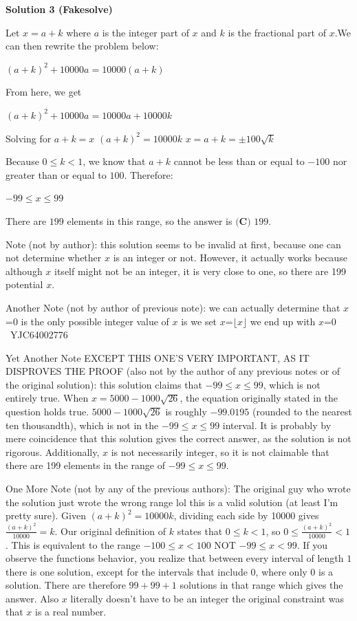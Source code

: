\begin{enumerate}
 



\textbf{Solution 3 (Fakesolve)}

Let $x = a+k$ where $a$ is the integer part of $x$ and $k$ is the fractional part of $x$.We can then rewrite the problem below:

 $(a+k)^2 + 10000a = 10000(a+k)$

 From here, we get

 $(a+k)^2 + 10000a = 10000a + 10000k$

 Solving for $a+k = x$
$(a+k)^2 = 10000k$
$x = a+k = \pm100\sqrt{k}$

 Because $0 \leq k < 1$, we know that $a+k$ cannot be less than or equal to $-100$ nor greater than or equal to $100$. Therefore:

 $-99 \leq x \leq 99$

 There are $199$ elements in this range, so the answer is $\boxed{\textbf{(C)} \text{ 199}}$.

 
Note (not by author): this solution seems to be invalid at first, because one can not determine whether $x$ is an integer or not. However, it actually works because although $x$ itself might not be an integer, it is very close to one, so there are 199 potential $x$.

 
Another Note (not by author of previous note): we can actually determine that $x$=0 is the only possible integer value of $x$ is we set $x$=$\lfloor x \rfloor$ we end up with $x$=0   ~YJC64002776

 
Yet Another Note EXCEPT THIS ONE'S VERY IMPORTANT, AS IT DISPROVES THE PROOF (also not by the author of any previous notes or of the original solution): this solution claims that $-99 \leq x \leq 99$, which is not entirely true. When $x = 5000-1000\sqrt{26}$, the equation originally stated in the question holds true. $5000-1000\sqrt{26}$ is roughly $-99.0195$ (rounded to the nearest ten thousandth), which is not in the $-99 \leq x \leq 99$ interval. It is probably by mere coincidence that this solution gives the correct answer, as the solution is not rigorous. Additionally, $x$ is not necessarily integer, so it is not claimable that there are 199 elements in the range of $-99 \leq x \leq 99$.

 
One More Note (not by any of the previous authors): The original guy who wrote the solution just wrote the wrong range lol this is a valid solution (at least I'm pretty sure). Given $(a+k)^2 = 10000k$, dividing each side by 10000 gives $\frac{(a+k)^2}{10000} = k$. Our original definition of $k$ states that $0 \leq k < 1$, so $0 \leq \frac{(a+k)^2}{10000} < 1$. This is equivalent to the range $-100 \leq x < 100$ NOT $-99 \leq x < 99$. If you observe the functions behavior, you realize that between every interval of length $1$ there is one solution, except for the intervals that include $0$, where only $0$ is a solution. There are therefore $99+99+1$ solutions in that range which gives the answer. Also $x$ literally doesn't have to be an integer the original constraint was that $x$ is a real number.


\end{enumerate}
